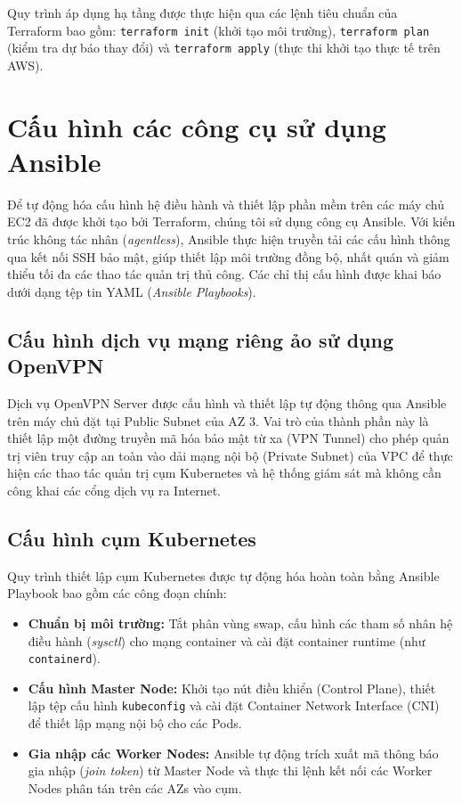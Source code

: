 Quy trình áp dụng hạ tầng được thực hiện qua các lệnh tiêu chuẩn của Terraform bao gồm: \texttt{terraform init} (khởi tạo môi trường), \texttt{terraform plan} (kiểm tra dự báo thay đổi) và \texttt{terraform apply} (thực thi khởi tạo thực tế trên AWS). 


\section{Cấu hình các công cụ sử dụng Ansible}

Để tự động hóa cấu hình hệ điều hành và thiết lập phần mềm trên các máy chủ EC2 đã được khởi tạo bởi Terraform, chúng tôi sử dụng công cụ Ansible. Với kiến trúc không tác nhân (\textit{agentless}), Ansible thực hiện truyền tải các cấu hình thông qua kết nối SSH bảo mật, giúp thiết lập môi trường đồng bộ, nhất quán và giảm thiểu tối đa các thao tác quản trị thủ công. Các chỉ thị cấu hình được khai báo dưới dạng tệp tin YAML (\textit{Ansible Playbooks}).

\subsection{Cấu hình dịch vụ mạng riêng ảo sử dụng OpenVPN}

Dịch vụ OpenVPN Server được cấu hình và thiết lập tự động thông qua Ansible trên máy chủ đặt tại Public Subnet của AZ 3. Vai trò của thành phần này là thiết lập một đường truyền mã hóa bảo mật từ xa (VPN Tunnel) cho phép quản trị viên truy cập an toàn vào dải mạng nội bộ (Private Subnet) của VPC để thực hiện các thao tác quản trị cụm Kubernetes và hệ thống giám sát mà không cần công khai các cổng dịch vụ ra Internet.

\subsection{Cấu hình cụm Kubernetes}

Quy trình thiết lập cụm Kubernetes được tự động hóa hoàn toàn bằng Ansible Playbook bao gồm các công đoạn chính:
\begin{itemize}
    \item \textbf{Chuẩn bị môi trường:} Tắt phân vùng swap, cấu hình các tham số nhân hệ điều hành (\textit{sysctl}) cho mạng container và cài đặt container runtime (như \texttt{containerd}).
    \item \textbf{Cấu hình Master Node:} Khởi tạo nút điều khiển (Control Plane), thiết lập tệp cấu hình \texttt{kubeconfig} và cài đặt Container Network Interface (CNI) để thiết lập mạng nội bộ cho các Pods.
    \item \textbf{Gia nhập các Worker Nodes:} Ansible tự động trích xuất mã thông báo gia nhập (\textit{join token}) từ Master Node và thực thi lệnh kết nối các Worker Nodes phân tán trên các AZs vào cụm.
\end{itemize}

